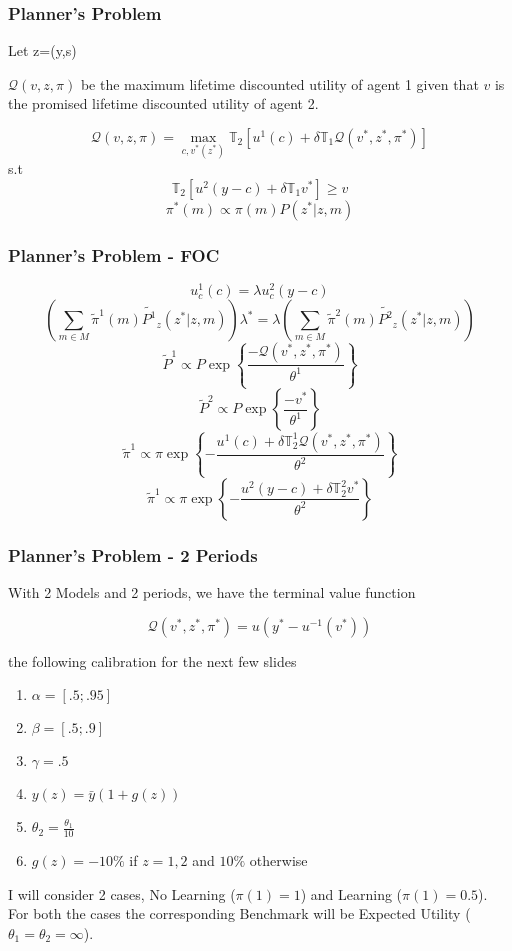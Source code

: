 \documentclass{beamer}
\theoremstyle{Definition}
\begin{document}
\begin{frame}
\frametitle{Planner's Problem}
Let z=(y,s)

$\mathcal{Q}(v,z,\pi)$ be the maximum lifetime discounted utility of agent 1 given that $v$ is the promised lifetime discounted utility of agent 2.

\[\mathcal{Q}(v,z,\pi)=\max_{c,v^*(z^*)} \mathbb{T}_2\left[u^1(c)+\delta \mathbb{T}_1 \mathcal{Q}(v^*,z^*,\pi^*)\right]\]
s.t
\[\mathbb{T}_2\left[u^2(y-c)+\delta \mathbb{T}_1 v^*\right]\geq v\] 
\[\pi^*(m)\propto \pi(m)P(z^*|z,m)\]
\end{frame}
\begin{frame}
\frametitle{Planner's Problem - FOC}
\small{
\[u^1_c(c)=\lambda u^2_c(y-c)\]
\[\left(\sum_{m \in M}\tilde{\pi}^1(m)\tilde{P^1}_z(z^* |z,m)\right)\lambda^*=\lambda\left(\sum_{m \in M}\tilde{\pi}^2(m)\tilde{P^2}_z(z^* |z,m)\right) \]
\[\tilde{P}^1 \propto P\exp\left\{\frac{-\mathcal{Q}(v^*,z^*,\pi^*)}{\theta^1}\right\}\]
\[\tilde{P}^2 \propto P\exp\left\{\frac{-v^*}{\theta^1}\right\}\]
\[\tilde{\pi}^1 \propto \pi \exp\left\{-\frac{ u^1(c)+\delta \mathbb{T}^1_2 \mathcal{Q}(v^*,z^*,\pi^*) }{\theta^2}\right\}\]
\[\tilde{\pi}^1 \propto \pi \exp\left\{-\frac{u^2(y-c)+\delta \mathbb{T}^2_2 v^*}{\theta^2}\right\}\]
}
\end{frame}

\begin{frame}
\frametitle{Planner's Problem - 2 Periods}
With 2 Models and 2 periods, we have the terminal value function

\[\mathcal{Q}(v^*,z^*,\pi^*) = u(y^*-u^{-1}(v^*))\]

the following calibration for the next few slides
\begin{enumerate}
	\item $\alpha =[ .5;.95]$
	\item $\beta=[.5;.9]$
	\item $\gamma=.5$
	\item $y(z)=\bar{y}(1+g(z))$
	\item $\theta_2=\frac{\theta_1}{10}$
	\item $g(z)=-10\%$ if $z=1,2$ and $10\%$ otherwise
\end{enumerate}

I will consider 2 cases, No Learning ($\pi(1)=1$) and Learning ($\pi(1)=0.5$). For both the cases the corresponding Benchmark will be Expected Utility ($\theta_1=\theta_2=\infty$).


\end{frame}
\end{document}
